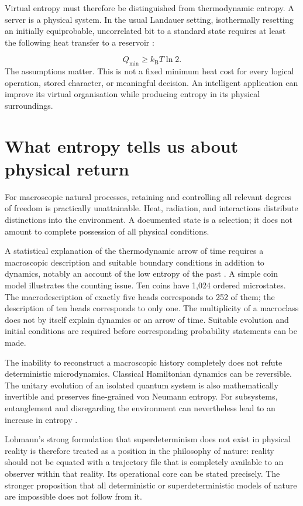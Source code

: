 Virtual entropy must therefore be distinguished from thermodynamic entropy. A server is a physical system. In the usual Landauer setting, isothermally resetting an initially equiprobable, uncorrelated bit to a standard state requires at least the following heat transfer to a reservoir \cite{9,18}:

\begin{equation}\label{en:eq5}
Q_{\min}\geq k_{\mathrm B}T\ln 2.
\end{equation}
The assumptions matter. This is not a fixed minimum heat cost for every logical operation, stored character, or meaningful decision. An intelligent application can improve its virtual organisation while producing entropy in its physical surroundings.

\section{What entropy tells us about physical return}\label{en:sec5}
For macroscopic natural processes, retaining and controlling all relevant degrees of freedom is practically unattainable. Heat, radiation, and interactions distribute distinctions into the environment. A documented state is a selection; it does not amount to complete possession of all physical conditions.

A statistical explanation of the thermodynamic arrow of time requires a macroscopic description and suitable boundary conditions in addition to dynamics, notably an account of the low entropy of the past \cite{17}. A simple coin model illustrates the counting issue. Ten coins have 1,024 ordered microstates. The macrodescription of exactly five heads corresponds to 252 of them; the description of ten heads corresponds to only one. The multiplicity of a macroclass does not by itself explain dynamics or an arrow of time. Suitable evolution and initial conditions are required before corresponding probability statements can be made.

The inability to reconstruct a macroscopic history completely does not refute deterministic microdynamics. Classical Hamiltonian dynamics can be reversible. The unitary evolution of an isolated quantum system is also mathematically invertible and preserves fine-grained von Neumann entropy. For subsystems, entanglement and disregarding the environment can nevertheless lead to an increase in entropy \cite{16,18}.

Lohmann's strong formulation that superdeterminism does not exist in physical reality is therefore treated as a position in the philosophy of nature: reality should not be equated with a trajectory file that is completely available to an observer within that reality. Its operational core can be stated precisely. The stronger proposition that all deterministic or superdeterministic models of nature are impossible does not follow from it.

